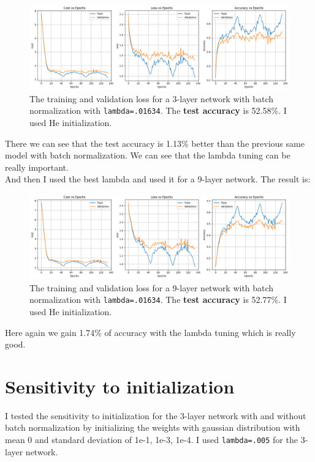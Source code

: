 \documentclass{article}
\begin{document}
\begin{figure}[H]
    \centering
    \includegraphics[width=\linewidth]{Result_Pics/3 layer - BN - lambda search.png}
    \caption{The training and validation loss for a 3-layer network with batch normalization with \texttt{lambda=.01634}. The \textbf{test accuracy} is 52.58\%. I used He initialization.}
\end{figure}

There we can see that the test accuracy is 1.13\% better than the previous same model with batch normalization. We can see that the lambda tuning can be really important. \\

And then I used the best lambda and used it for a 9-layer network. The result is:

\begin{figure}[H]
    \centering
    \includegraphics[width=\linewidth]{Result_Pics/9 layer - BN - lambda search.png}
    \caption{The training and validation loss for a 9-layer network with batch normalization with \texttt{lambda=.01634}. The \textbf{test accuracy} is 52.77\%. I used He initialization.}
\end{figure}

Here again we gain 1.74\% of accuracy with the lambda tuning which is really good. \\

\section*{Sensitivity to initialization}

I tested the sensitivity to initialization for the 3-layer network with and without batch normalization by initializing the weights with gaussian distribution with mean 0 and standard deviation of 1e-1, 1e-3, 1e-4. I used \texttt{lambda=.005} for the 3-layer network. \\
\end{document}

